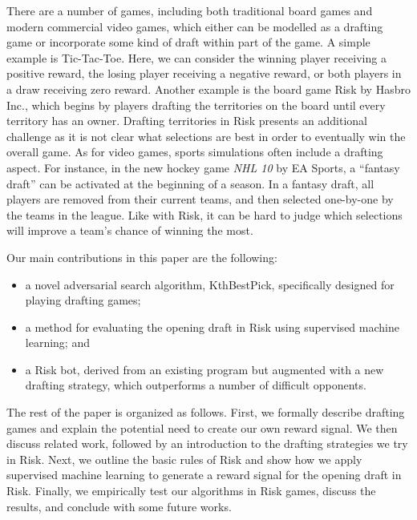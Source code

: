 \documentclass[letterpaper]{article}
\numberwithin{equation}{section}
\numberwithin{theorem}{section}
\numberwithin{lemma}{section}
\numberwithin{df}{section}
\begin{document}
There are a number of games, including both traditional board games and modern commercial video games, which either can be modelled as a drafting game or incorporate some kind of draft within part of the game.  A simple example is Tic-Tac-Toe. Here, we can consider the winning player receiving a positive reward, the losing player receiving a negative reward, or both players in a draw receiving zero reward. Another example is the board game Risk by Hasbro Inc., which begins by players drafting the territories on the board until every territory has an owner.  Drafting territories in Risk presents an additional challenge as it is not clear what selections are best in order to eventually win the overall game.  As for video games, sports simulations often include a drafting aspect.  For instance, %
in the new hockey game \textit{NHL 10} by EA Sports, a ``fantasy draft'' can be activated at the beginning of a season.  In a fantasy draft, all players are removed from their current teams, and then selected one-by-one by the teams in the league.  Like with Risk, it can be hard to judge which selections will improve a team's chance of winning the most.  %

Our main contributions in this paper are the following:
\begin{itemize} \addtolength{\itemsep}{-0.5\baselineskip}
	\item a novel adversarial search algorithm, KthBestPick, specifically designed for playing drafting games;
	\item a method for evaluating the opening draft in Risk using supervised machine learning; and
	\item a Risk bot, derived from an existing program but augmented with a new drafting strategy, which outperforms a number of difficult opponents.
\end{itemize}
The rest of the paper is organized as follows.  First, we formally describe drafting games and explain the potential need to create our own reward signal.  We then discuss related work, followed by an introduction to the drafting strategies we try in Risk.  Next, we outline the basic rules of Risk and show how we apply supervised machine learning to generate a reward signal for the opening draft in Risk.  Finally, we empirically test our algorithms in Risk games, discuss the results, and conclude with some future works.
\end{document}
